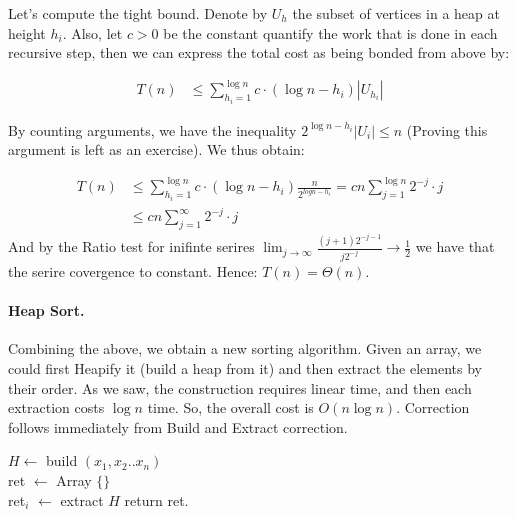 Let's compute the tight bound. Denote by $U_h$ the subset of vertices in a heap at height $h_{i}$. Also, let $c > 0 $ be the constant quantify the work that is done in each recursive step, then we can express the total cost as being bonded from above by: 

\begin{equation*}
  \begin{split}
    T\left( n \right) & \le \sum_{ h_{i} =1}^{ \log n }{c \cdot \left( \log n -  h_{i} \right)  |U_{h_{i}}|   } 
  \end{split}
\end{equation*}

By counting arguments, we have the inequality $ 2^{\log n - h_{i}}|U_{i}| \le n $ (Proving this argument is left as an exercise). We thus obtain:  

\begin{equation*}
  \begin{split}
    T\left( n \right)  & \le  \sum_{ h_{i} =1}^{ \log n }{c \cdot \left( \log n -  h_{i} \right) \frac{n}{2^{log n - h_{i}} }} = c n \sum_{ j = 1}^{ \log n }{ 2^{-j} \cdot j  }  \\ 
      & \le   c n \sum_{ j = 1}^{ \infty }{ 2^{-j} \cdot j  } 
  \end{split}
\end{equation*}
And by the Ratio test for inifinte serires $ \lim_{j\rightarrow \infty} \frac{(j+1)2^{-j-1}}{j2^{-j}} \rightarrow \frac{1}{2}$ we have that the serire covergence to constant. Hence: $ T\left( n \right) = \Theta\left( n \right) $. 


\newpage

\ifdefined\Book

\paragraph{Heap Sort.}   
Combining the above, we obtain a new sorting algorithm. Given an array, we could first Heapify it (build a heap from it) and then extract the elements by their order. As we saw, the construction requires linear time, and then each extraction costs $\log n$ time. So, the overall cost is $O\left( n\log n  \right)$. Correction follows immediately from Build and Extract correction.  
\begin{algorithm}
  $H \leftarrow $ build $ \left( x_1, x_2 .. x_{n}  \right) $ \\ 
  ret $ \leftarrow $ Array $ \{ \} $ \\
   {
  ret$_{i}$ $\leftarrow$ extract $H$
  }
  return ret. 
\end{algorithm}

